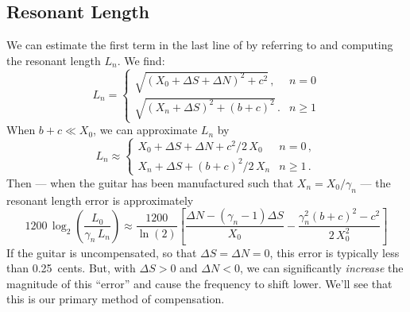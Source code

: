  \subsection{Resonant Length}
We can estimate the first term in the last line of  by referring to  and computing the resonant length $L_n$. We find:
 \begin{equation}  \label{eqn:l_n_def}
L_n = \begin{cases}
\sqrt{\left(X_0 + \Delta S + \Delta N\right)^2 + c^2}\, , & n =  0 \\
\sqrt{\left(X_n + \Delta S\right)^2 + (b + c)^2}\, . & n \ge 1
 \end{cases}
 \end{equation}
When $b + c \ll X_0$, we can approximate $L_n$ by
 \begin{equation} \label{eqn:l_n_approx}
L_n \approx \begin{cases}
X_0 + \Delta S + \Delta N + c^2/2\, X_0 & n =  0\, , \\
X_n + \Delta S + (b + c)^2/2\, X_n & n \ge 1\, .
 \end{cases}
 \end{equation}
Then --- when the guitar has been manufactured such that $X_n = X_0 / \gamma_n$ --- the resonant length error is approximately
  \begin{equation} \label{eqn:rle_approx}
  1200\, \log_2 \left( \frac{L_0}{\gamma_n\, L_n} \right) \approx \frac{1200}{\ln(2)} \left[ \frac{\Delta N - \left(\gamma_n - 1\right) \Delta S}{X_0} - \frac{\gamma_n^2 (b + c)^2 - c^2}{2\, X_0^2}\right]
  \end{equation}
If the guitar is uncompensated, so that $\Delta S = \Delta N = 0$, this error is typically less than 0.25~cents. But, with $\Delta S > 0$ and $\Delta N < 0$, we can significantly \emph{increase} the magnitude of this ``error'' and cause the frequency to shift lower. We'll see that this is our primary method of compensation. 


